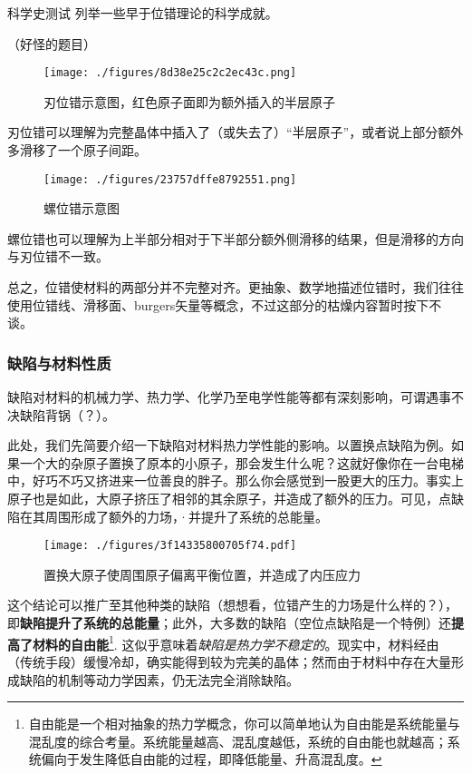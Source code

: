 \begin{exercise}{科学史测试}
列举一些早于位错理论的科学成就。

（好怪的题目）
\end{exercise}

\begin{figure}[ht]
\centering
\texttt{[image: ./figures/8d38e25c2c2ec43c.png]}
\caption{刃位错示意图，红色原子面即为额外插入的半层原子} \label{fig_MetInt_20}
\end{figure}

刃位错可以理解为完整晶体中插入了（或失去了）“半层原子”，或者说上部分额外多滑移了一个原子间距。

\begin{figure}[ht]
\centering
\texttt{[image: ./figures/23757dffe8792551.png]}
\caption{螺位错示意图} \label{fig_MetInt_21}
\end{figure}

螺位错也可以理解为上半部分相对于下半部分额外侧滑移的结果，但是滑移的方向与刃位错不一致。

总之，位错使材料的两部分并不完整对齐。更抽象、数学地描述位错时，我们往往使用位错线、滑移面、burgers矢量等概念，不过这部分的枯燥内容暂时按下不谈。


\subsubsection{缺陷与材料性质}
缺陷对材料的机械力学、热力学、化学乃至电学性能等都有深刻影响，可谓遇事不决缺陷背锅（？）。

此处，我们先简要介绍一下缺陷对材料热力学性能的影响。以置换点缺陷为例。如果一个大的杂原子置换了原本的小原子，那会发生什么呢？这就好像你在一台电梯中，好巧不巧又挤进来一位善良的胖子。那么你会感觉到一股更大的压力。事实上原子也是如此，大原子挤压了相邻的其余原子，并造成了额外的压力。可见，点缺陷在其周围形成了额外的力场，·并提升了系统的总能量。
\begin{figure}[ht]
\centering
\texttt{[image: ./figures/3f14335800705f74.pdf]}
\caption{置换大原子使周围原子偏离平衡位置，并造成了内压应力} \label{fig_MetInt_9}
\end{figure}

这个结论可以推广至其他种类的缺陷（想想看，位错产生的力场是什么样的？），即\textbf{缺陷提升了系统的总能量}；此外，大多数的缺陷（空位点缺陷是一个特例）还\textbf{提高了材料的自由能}\footnote{自由能是一个相对抽象的热力学概念，你可以简单地认为自由能是系统能量与混乱度的综合考量。系统能量越高、混乱度越低，系统的自由能也就越高；系统偏向于发生降低自由能的过程，即降低能量、升高混乱度。}. 这似乎意味着\textsl{缺陷是热力学不稳定的}。现实中，材料经由（传统手段）缓慢冷却，确实能得到较为完美的晶体；然而由于材料中存在大量形成缺陷的机制等动力学因素，仍无法完全消除缺陷。

